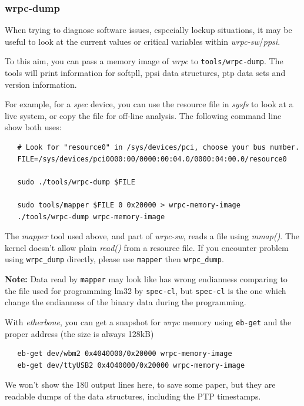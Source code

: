 \documentclass[a4paper, 12pt]{article}
\begin{document}
\subsubsection{wrpc-dump}
\label{wrpc-dump}

When trying to diagnose software issues, especially lockup situations,
it may be useful to look at the current values or critical variables
within \textit{wrpc-sw}/\textit{ppsi}.

To this aim, you can pass a memory image of \textit{wrpc} to \texttt{tools/wrpc-dump}.
The tools will print information for softpll, ppsi data structures,
ptp data sets and version information.

For example, for a \textit{spec} device, you can use the resource file in
\textit{sysfs} to look at a live system, or copy the file for off-line
analysis. The following command line show both uses:

\begin{lstlisting}
   # Look for "resource0" in /sys/devices/pci, choose your bus number.
   FILE=/sys/devices/pci0000:00/0000:00:04.0/0000:04:00.0/resource0

   sudo ./tools/wrpc-dump $FILE

   sudo tools/mapper $FILE 0 0x20000 > wrpc-memory-image
   ./tools/wrpc-dump wrpc-memory-image
\end{lstlisting}

The \textit{mapper} tool used above, and part of \textit{wrpc-sw}, reads a file
using \textit{mmap()}. The kernel doesn't allow plain \textit{read()} from a
resource file. If you encounter problem using \texttt{wrpc\_dump} directly,
please use \texttt{mapper} then \texttt{wrpc\_dump}.

\textbf{Note:} Data read by \texttt{mapper} may look like has wrong endianness comparing
to the file used for programming lm32 by \texttt{spec-cl}, but \texttt{spec-cl} is the
one which change the endianness of the binary data during the programming.

With \textit{etherbone}, you can get a snapshot for \textit{wrpc} memory using
\texttt{eb-get} and the proper address (the size is always 128kB)

\begin{lstlisting}
   eb-get dev/wbm2 0x4040000/0x20000 wrpc-memory-image
   eb-get dev/ttyUSB2 0x4040000/0x20000 wrpc-memory-image
\end{lstlisting}

We won't show the 180 output lines here, to save some paper, but they
are readable dumps of the data structures, including the PTP timestamps.
\end{document}
